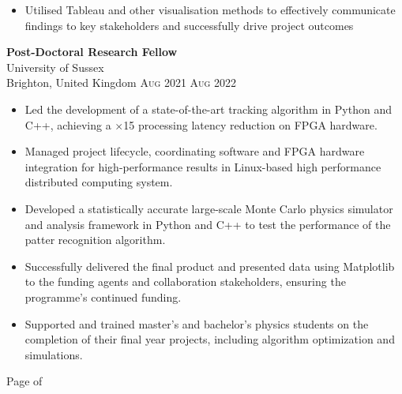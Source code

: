 \documentclass[oneside]{article}
\newcommand{\empitem}[7]{
        {\large \textbf{#1}} \\
        {{\fontseries{medium}\selectfont #2}}\\
        {{\fontseries{light}\selectfont #3}} \hfill
        {\scshape\fontseries{light}\selectfont\footnotesize #4 \textendash{} #5 #6} 
        #7
}
\begin{document}
{\begin{minipage}[t][\dimexpr\textheight-2\fboxrule-2\fboxsep\relax][t]{\dimexpr0.6\textwidth-2\fboxrule-2\fboxsep\relax}
{\begin{itemize}
            \item Utilised Tableau and other visualisation methods to effectively communicate findings to key stakeholders and successfully drive project outcomes
        \end{itemize}
        }
%
        \empitem{Post-Doctoral Research Fellow}
        {University of Sussex}
        {Brighton, United Kingdom}
        {Aug 2021}
        {Aug 2022}
        {}
        {
        \begin{itemize}
            \setlength{\itemsep}{-3pt}
            \item Led the development of a state-of-the-art tracking algorithm in Python and C++, achieving a $\times$15 processing latency reduction on FPGA hardware.%
            \item Managed project lifecycle, coordinating software and FPGA hardware integration for high-performance results in Linux-based high performance distributed computing system.
            \item Developed a statistically accurate large-scale Monte Carlo physics simulator and analysis framework in Python and C++ to test the performance of the patter recognition algorithm.
            \item Successfully delivered the final product and presented data using Matplotlib to the funding agents and collaboration stakeholders, ensuring the programme’s continued funding.
            \item Supported and trained master’s and bachelor’s physics students on the completion of their final year projects, including algorithm optimization and simulations.
        \end{itemize}
        }
        \vfill%
        {\hfill\small{}\selectfont Page \thepage of \pageref{LastPage}\hfill}
    \end{minipage}
}

\newpage
\end{document}
